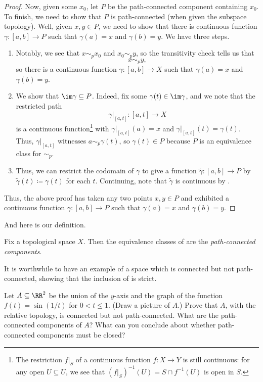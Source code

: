 \documentclass[../notes.tex]{subfiles}
\begin{document}
\begin{proof}
	Now, given some $x_0$, let $P$ be the path-connected component containing $x_0$. To finish, we need to show that $P$ is path-connected (when given the subspace topology). Well, given $x,y\in P$, we need to show that there is continuous function $\gamma\colon[a,b]\to P$ such that $\gamma(a)=x$ and $\gamma(b)=y$. We have three steps.
	\begin{enumerate}
		\item Notably, we see that $x\sim_px_0$ and $x_0\sim_py$, so the transitivity check tells us that
		\[x\sim_py,\]
		so there is a continuous function $\gamma\colon[a,b]\to X$ such that $\gamma(a)=x$ and $\gamma(b)=y$. 
		\item We show that $\im\gamma\subseteq P$. Indeed, fix some $\gamma(t)\in\im\gamma$, and we note that the restricted path
		\[\gamma|_{[a,t]}\colon[a,t]\to X\]
		is a continuous function\footnote{The restriction $f|_S$ of a continuous function $f\colon X\to Y$ is still continuous: for any open $U\subseteq U$, we see that $(f|_S)^{-1}(U)=S\cap f^{-1}(U)$ is open in $S$.} with $\gamma|_{[a,t]}(a)=x$ and $\gamma|_{[a,t]}(t)=\gamma(t)$. Thus, $\gamma|_{[a,t]}$ witnesses $a\sim_p\gamma(t)$, so $\gamma(t)\in P$ because $P$ is an equivalence class for $\sim_p$.
		\item Thus, we can restrict the codomain of $\gamma$ to give a function $\widetilde\gamma\colon[a,b]\to P$ by $\widetilde\gamma(t)\coloneqq\gamma(t)$ for each $t$. Continuing, note that $\widetilde\gamma$ is continuous by .
	\end{enumerate}
	Thus, the above proof has taken any two points $x,y\in P$ and exhibited a continuous function $\gamma\colon[a,b]\to P$ such that $\gamma(a)=x$ and $\gamma(b)=y$.
\end{proof}
And here is our definition.
\begin{definition}
	Fix a topological space $X$. Then the equivalence classes of  are the \textit{path-connected components}.
\end{definition}
It is worthwhile to have an example of a space which is connected but not path-connected, showing that the inclusion of  is strict.
\begin{lemma}
	Let $A\subseteq\RR^2$ be the union of the $y$-axis and the graph of the function $f(t)=\sin(1/t)$ for $0<t\le1$. (Draw a picture of $A$.) Prove that $A$, with the relative topology, is connected but not path-connected. What are the path-connected components of $A$? What can you conclude about whether path-connected components must be closed?
\end{lemma}
\end{document}
